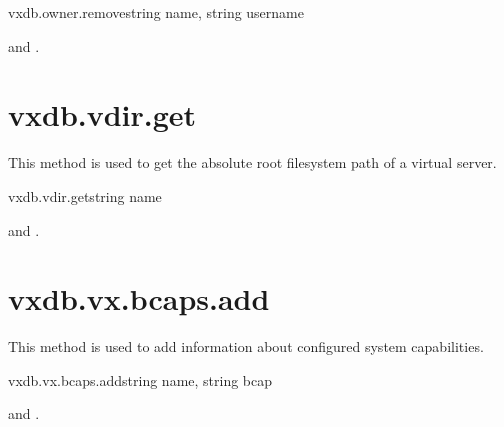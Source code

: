\begin{rpcsynopsis}{vxdb.owner.remove}{string name, string username}
\end{rpcsynopsis}

\begin{rpcaccess}
 and \rpcnoownerchecks.
\end{rpcaccess}

\rpcreturnnil

\rpcnoerrors


\section{vxdb.vdir.get}

This method is used to get the absolute root filesystem path of a virtual
server.

\begin{rpcsynopsis}{vxdb.vdir.get}{string name}
\end{rpcsynopsis}

\begin{rpcaccess}
 and \rpcnoownerchecks.
\end{rpcaccess}


\rpcnoerrors


\section{vxdb.vx.bcaps.add}

This method is used to add information about configured system capabilities.

\begin{rpcsynopsis}{vxdb.vx.bcaps.add}{string name, string bcap}
\end{rpcsynopsis}

\begin{rpcaccess}
 and \rpcownerchecks.
\end{rpcaccess}

\rpcreturnnil

\rpcnoerrors


